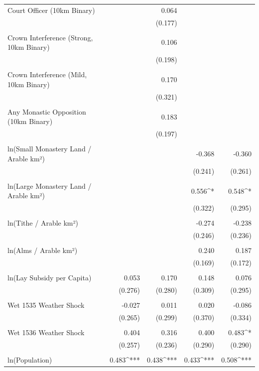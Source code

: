 \begin{table}[H]
\begin{tabular}{@{\extracolsep{.5pt}}lD{.}{.}{-3} D{.}{.}{-3} D{.}{.}{-3} D{.}{.}{-3} }
 Court Officer (10km Binary) &  & 0.064 &  &  \\ 
  &  & (0.177) &  &  \\ 
  & & & & \\ 
 Crown Interference (Strong, 10km Binary) &  & 0.106 &  &  \\ 
  &  & (0.198) &  &  \\ 
  & & & & \\ 
 Crown Interference (Mild, 10km Binary) &  & 0.170 &  &  \\ 
  &  & (0.321) &  &  \\ 
  & & & & \\ 
 Any Monastic Opposition (10km Binary) &  & 0.183 &  &  \\ 
  &  & (0.197) &  &  \\ 
  & & & & \\ 
 ln(Small Monastery Land / Arable km²) &  &  & -0.368 & -0.360 \\ 
  &  &  & (0.241) & (0.261) \\ 
  & & & & \\ 
 ln(Large Monastery Land / Arable km²) &  &  & 0.556^{*} & 0.548^{*} \\ 
  &  &  & (0.322) & (0.295) \\ 
  & & & & \\ 
 ln(Tithe / Arable km²) &  &  & -0.274 & -0.238 \\ 
  &  &  & (0.246) & (0.236) \\ 
  & & & & \\ 
 ln(Alms / Arable km²) &  &  & 0.240 & 0.187 \\ 
  &  &  & (0.169) & (0.172) \\ 
  & & & & \\ 
 ln(Lay Subsidy per Capita) & 0.053 & 0.170 & 0.148 & 0.076 \\ 
  & (0.276) & (0.280) & (0.309) & (0.295) \\ 
  & & & & \\ 
 Wet 1535 Weather Shock & -0.027 & 0.011 & 0.020 & -0.086 \\ 
  & (0.265) & (0.299) & (0.370) & (0.334) \\ 
  & & & & \\ 
 Wet 1536 Weather Shock & 0.404 & 0.316 & 0.400 & 0.483^{*} \\ 
  & (0.257) & (0.236) & (0.290) & (0.290) \\ 
  & & & & \\ 
 ln(Population) & 0.483^{***} & 0.438^{***} & 0.433^{***} & 0.508^{***} \\ 

\end{tabular}
\end{table}
